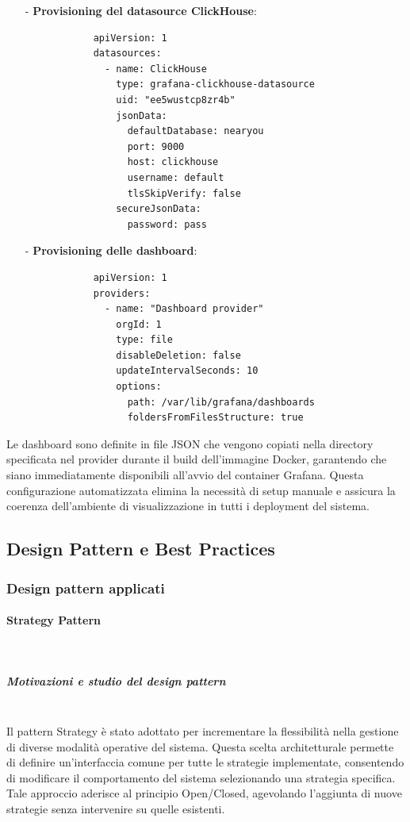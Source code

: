 \documentclass[10pt]{article}
\newcommand{\myparagraph}[1]{\paragraph{#1}\mbox{}\\}
\newcommand{\mysubparagraph}[1]{\subparagraph{#1}\mbox{}\\}
\begin{document}
        \begin{itemize}
            \item[-] \textbf{Provisioning del datasource ClickHouse}:
            \begin{lstlisting}
            apiVersion: 1
            datasources:
              - name: ClickHouse
                type: grafana-clickhouse-datasource
                uid: "ee5wustcp8zr4b"
                jsonData:
                  defaultDatabase: nearyou
                  port: 9000
                  host: clickhouse
                  username: default
                  tlsSkipVerify: false
                secureJsonData:
                  password: pass
            \end{lstlisting}

            \item[-] \textbf{Provisioning delle dashboard}:
            \begin{lstlisting}
            apiVersion: 1
            providers:
              - name: "Dashboard provider"
                orgId: 1
                type: file
                disableDeletion: false
                updateIntervalSeconds: 10
                options:
                  path: /var/lib/grafana/dashboards
                  foldersFromFilesStructure: true
            \end{lstlisting}
        \end{itemize}

        Le dashboard sono definite in file JSON che vengono copiati nella directory specificata nel provider durante il build dell'immagine Docker, garantendo che siano immediatamente disponibili all'avvio del container Grafana. Questa configurazione automatizzata elimina la necessità di setup manuale e assicura la coerenza dell'ambiente di visualizzazione in tutti i deployment del sistema.

\subsection{Design Pattern e Best Practices}
\subsubsection{Design pattern applicati}
\myparagraph{Strategy Pattern}

    \mysubparagraph{Motivazioni e studio del design pattern}
    Il pattern Strategy è stato adottato per incrementare la flessibilità nella gestione di diverse modalità operative del sistema. Questa scelta architetturale permette di definire un'interfaccia comune per tutte le strategie implementate, consentendo di modificare il comportamento del sistema selezionando una strategia specifica. Tale approccio aderisce al principio Open/Closed, agevolando l'aggiunta di nuove strategie senza intervenire su quelle esistenti.
\end{document}

